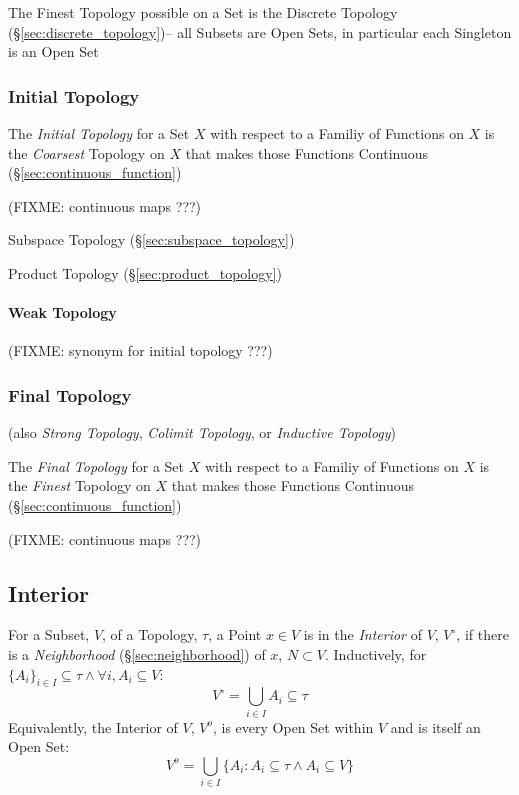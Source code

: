 The Finest Topology possible on a Set is the Discrete Topology
(\S\ref{sec:discrete_topology})-- all Subsets are Open Sets, in particular each
Singleton is an Open Set



\subsubsection{Initial Topology}\label{sec:initial_topology}

The \emph{Initial Topology} for a Set $X$ with respect to a Familiy of
Functions on $X$ is the \emph{Coarsest} Topology on $X$ that makes those
Functions Continuous (\S\ref{sec:continuous_function})

(FIXME: continuous maps ???)

Subspace Topology (\S\ref{sec:subspace_topology})

Product Topology (\S\ref{sec:product_topology})



\paragraph{Weak Topology}\label{sec:weak_topology}

(FIXME: synonym for initial topology ???)



\subsubsection{Final Topology}\label{sec:final_topology}

(also \emph{Strong Topology}, \emph{Colimit Topology}, or
\emph{Inductive Topology})

The \emph{Final Topology} for a Set $X$ with respect to a Familiy of
Functions on $X$ is the \emph{Finest} Topology on $X$ that makes those
Functions Continuous (\S\ref{sec:continuous_function})

(FIXME: continuous maps ???)



\subsection{Interior}\label{sec:interior}

For a Subset, $V$, of a Topology, $\tau$, a Point $x \in V$ is in the
\emph{Interior} of $V$, $V^{\circ}$, if there is a \emph{Neighborhood}
(\S\ref{sec:neighborhood}) of $x$, $N \subset V$. Inductively, for
$\{A_i\}_{i \in I} \subseteq \tau \wedge \forall i, A_i \subseteq V$:
\[
  V^{\circ} = \bigcup_{i \in I} A_i \subseteq \tau
\]
Equivalently, the Interior of $V$, $V^o$, is every Open Set within $V$
and is itself an Open Set:
\[
  V^o = \bigcup_{i \in I} \{ A_i : A_i \subseteq \tau \wedge A_i
  \subseteq V \}
\]



